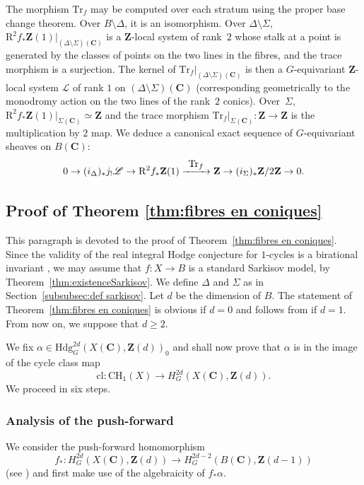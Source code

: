 \documentclass[JEP,XML,SOM,Unicode]{cedram}
\newcommand{\To}[1]{\mathchoice{\xrightarrow{\textstyle\kern4pt#1\kern3pt}}{\stackrel{#1}{\longrightarrow}}{}{}}
\theoremstyle{plain}
\theoremstyle{definition}
\numberwithin{equation}{section}
\newcommand{\cl}{{\mathrm{cl}}}
\renewcommand{\C}{{\mathbf C}}
\newcommand{\Z}{{\mathbf Z}}
\newcommand{\CH}{\mathrm{CH}}
\newcommand{\Hdg}{\mathrm{Hdg}}
\newcommand{\Trf}{\mathrm{Tr}_f}
\newcommand{\RR}{{\mathrm{R}}}
\begin{document}
The morphism $\Trf$ may be computed over each stratum using the proper base change theorem. Over $B\setminus\Delta$, it is an isomorphism. Over $\Delta\setminus\Sigma$, $\RR^2f_*\Z(1)|_{(\Delta\setminus\Sigma)(\C)}$ is a $\Z$-local system of rank~$2$ whose stalk at a point is generated by the classes of points on the two lines in the fibres, and the trace morphism is a surjection. The kernel of $\Trf |_{(\Delta\setminus\Sigma)(\C)}$ is then a $G$-equivariant $\Z$-local system $\mathscr{L}$ of rank $1$ on $(\Delta\setminus\Sigma)(\C)$ (corresponding geometrically to the monodromy action on the two lines of the rank~$2$ conics). Over~$\Sigma$, $\RR^2f_*\Z(1)|_{\Sigma(\C)}\simeq\Z$ and the trace morphism $\Trf |_{\Sigma(\C)}:\Z\to\Z$ is the multiplication by $2$ map. We deduce a canonical exact sequence of $G$-equivariant sheaves on $B(\C)$:
\begin{equation}
\label{eq:morphisme trace}
0\to (i_{\Delta})_*j_!\mathscr{L}\to \RR^2f_*\Z(1)\To{\Trf} \Z\to (i_{\Sigma})_*\Z/2\Z\to 0.
\end{equation}

\subsection{Proof of Theorem \ref{thm:fibres en coniques}}
\label{subsec:proofconicbundles}
This paragraph is devoted to the proof of Theorem~\ref{thm:fibres en coniques}.
Since the validity of the real integral Hodge conjecture for $1$-cycles is a birational invariant \cite[Prop.\,\ref*{BW1-prop:birinvIHC}]{BW1}, we may assume that $f:X\to B$ is a standard Sarkisov model, by Theorem~\ref{thm:existenceSarkisov}. We define $\Delta$ and $\Sigma$ as in Section~\ref{subsubsec:def sarkisov}. Let $d$ be the dimension of $B$. The statement of Theorem~\ref{thm:fibres en coniques} is obvious if $d=0$ and follows from \cite[Prop.\,\ref*{BW1-prop:real(1,1)}]{BW1} if $d=1$. From now on, we suppose that $d\geq 2$.

We fix $\alpha\in \Hdg^{2d}_G(X(\C),\Z(d))_0$ and shall now prove that $\alpha$ is in the image of the cycle class map
\[
\cl:\CH_1(X)\to H^{2d}_G(X(\C),\Z(d)).
\]
We proceed in six steps.

\subsubsection{Analysis of the push-forward}
\label{subsub:reallocus}
We consider the push-forward homomorphism
\[
f_*:H^{2d}_G(X(\C),\Z(d)) \to H^{2d-2}_G(B(\C),\Z(d-1))
\]
(see \cite[(\ref*{BW1-eq:pushforward equivariant complex})]{BW1})
and first make use of the algebraicity of $f_*\alpha$.
\end{document}
